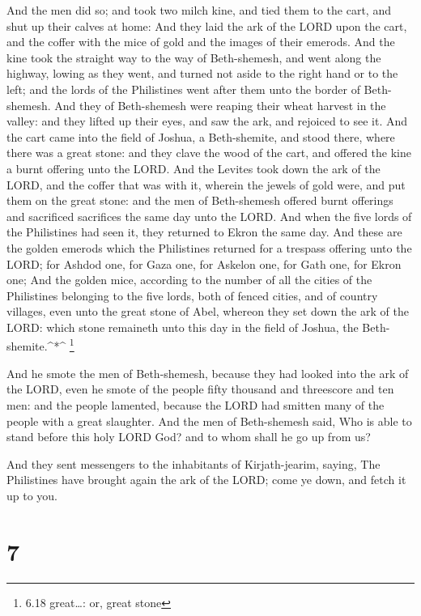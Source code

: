  And the men did so; and took two milch kine, and tied them
to the cart, and shut up their calves at home:  And they
laid the ark of the LORD upon the cart, and the coffer with the mice of
gold and the images of their emerods.  And the kine took
the straight way to the way of Beth-shemesh, and went along the highway,
lowing as they went, and turned not aside to the right hand or to the
left; and the lords of the Philistines went after them unto the border
of Beth-shemesh.  And they of Beth-shemesh were reaping
their wheat harvest in the valley: and they lifted up their eyes, and
saw the ark, and rejoiced to see it.  And the cart came
into the field of Joshua, a Beth-shemite, and stood there, where there
was a great stone: and they clave the wood of the cart, and offered the
kine a burnt offering unto the LORD.  And the Levites took
down the ark of the LORD, and the coffer that was with it, wherein the
jewels of gold were, and put them on the great stone: and the men of
Beth-shemesh offered burnt offerings and sacrificed sacrifices the same
day unto the LORD.  And when the five lords of the
Philistines had seen it, they returned to Ekron the same day.
 And these are the golden emerods which the Philistines
returned for a trespass offering unto the LORD; for Ashdod one, for Gaza
one, for Askelon one, for Gath one, for Ekron one;  And the
golden mice, according to the number of all the cities of the
Philistines belonging to the five lords, both of fenced cities, and of
country villages, even unto the great stone of Abel, whereon they set
down the ark of the LORD: which stone remaineth unto this day in the
field of Joshua, the Beth-shemite.\^{}*\^{} \footnote{6.18 great\ldots:
  or, great stone}

 And he smote the men of Beth-shemesh, because they had
looked into the ark of the LORD, even he smote of the people fifty
thousand and threescore and ten men: and the people lamented, because
the LORD had smitten many of the people with a great slaughter.
 And the men of Beth-shemesh said, Who is able to stand
before this holy LORD God? and to whom shall he go up from us?

 And they sent messengers to the inhabitants of
Kirjath-jearim, saying, The Philistines have brought again the ark of
the LORD; come ye down, and fetch it up to you.

\hypertarget{section-6}{%
\section{7}\label{section-6}}

